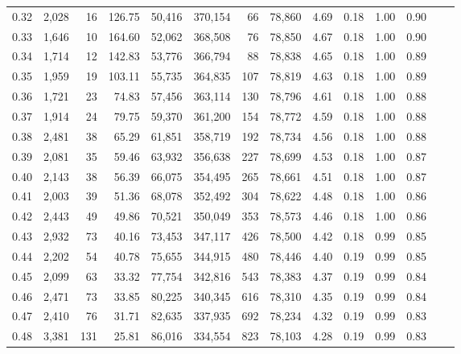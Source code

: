 \begin{tabular}{rrrrrrrrrrrrrr}
0.32 &   2,028 &     16 &   126.75 &   50,416 &  370,154 &      66 &  78,860 &  4.69 &  0.18 &  1.00 &      0.90 \\
0.33 &   1,646 &     10 &   164.60 &   52,062 &  368,508 &      76 &  78,850 &  4.67 &  0.18 &  1.00 &      0.90 \\
0.34 &   1,714 &     12 &   142.83 &   53,776 &  366,794 &      88 &  78,838 &  4.65 &  0.18 &  1.00 &      0.89 \\
0.35 &   1,959 &     19 &   103.11 &   55,735 &  364,835 &     107 &  78,819 &  4.63 &  0.18 &  1.00 &      0.89 \\
0.36 &   1,721 &     23 &    74.83 &   57,456 &  363,114 &     130 &  78,796 &  4.61 &  0.18 &  1.00 &      0.88 \\
0.37 &   1,914 &     24 &    79.75 &   59,370 &  361,200 &     154 &  78,772 &  4.59 &  0.18 &  1.00 &      0.88 \\
0.38 &   2,481 &     38 &    65.29 &   61,851 &  358,719 &     192 &  78,734 &  4.56 &  0.18 &  1.00 &      0.88 \\
0.39 &   2,081 &     35 &    59.46 &   63,932 &  356,638 &     227 &  78,699 &  4.53 &  0.18 &  1.00 &      0.87 \\
0.40 &   2,143 &     38 &    56.39 &   66,075 &  354,495 &     265 &  78,661 &  4.51 &  0.18 &  1.00 &      0.87 \\
0.41 &   2,003 &     39 &    51.36 &   68,078 &  352,492 &     304 &  78,622 &  4.48 &  0.18 &  1.00 &      0.86 \\
0.42 &   2,443 &     49 &    49.86 &   70,521 &  350,049 &     353 &  78,573 &  4.46 &  0.18 &  1.00 &      0.86 \\
0.43 &   2,932 &     73 &    40.16 &   73,453 &  347,117 &     426 &  78,500 &  4.42 &  0.18 &  0.99 &      0.85 \\
0.44 &   2,202 &     54 &    40.78 &   75,655 &  344,915 &     480 &  78,446 &  4.40 &  0.19 &  0.99 &      0.85 \\
0.45 &   2,099 &     63 &    33.32 &   77,754 &  342,816 &     543 &  78,383 &  4.37 &  0.19 &  0.99 &      0.84 \\
0.46 &   2,471 &     73 &    33.85 &   80,225 &  340,345 &     616 &  78,310 &  4.35 &  0.19 &  0.99 &      0.84 \\
0.47 &   2,410 &     76 &    31.71 &   82,635 &  337,935 &     692 &  78,234 &  4.32 &  0.19 &  0.99 &      0.83 \\
0.48 &   3,381 &    131 &    25.81 &   86,016 &  334,554 &     823 &  78,103 &  4.28 &  0.19 &  0.99 &      0.83 \\

\end{tabular}
